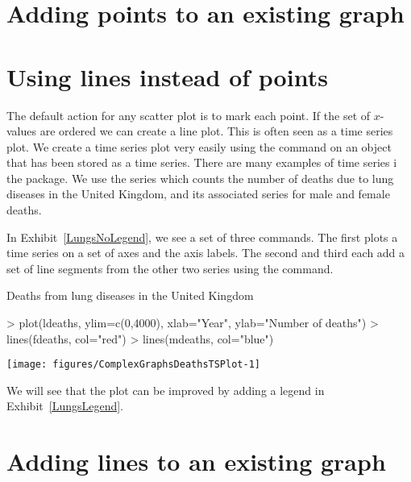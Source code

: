 \section{Adding points to an existing graph}

\section{Using lines instead of points} \label{LinesInsteadOfPoints} 

The default action for any scatter plot is to mark each point. If the set of $x$-values are ordered we can create a line plot. This is often seen as a time series plot. We create a time series plot very easily using the  command on an object that has been stored as a time series. There are many examples of time series i the  package. We use the  series which counts the number of deaths due to lung diseases in the United Kingdom, and its associated series for male and female deaths.

In Exhibit~\ref{LungsNoLegend}, we see a set of three commands. The first plots a time series on a set of axes and the axis labels. The second and third each add a set of line segments from the other two series using the  command.

\begin{exhibit}
\begin{center}
\caption{Deaths from lung diseases in the United Kingdom}
\label{LungsNoLegend}
\begin{Schunk}
\begin{Sinput}
> plot(ldeaths, ylim=c(0,4000), xlab="Year", ylab="Number of deaths")
> lines(fdeaths, col="red")
> lines(mdeaths, col="blue")
\end{Sinput}

\texttt{[image: figures/ComplexGraphsDeathsTSPlot-1]} \end{Schunk}
\end{center}
\end{exhibit}

We will see that the plot can be improved by adding a legend in Exhibit~\ref{LungsLegend}.


\section{Adding lines to an existing graph}

